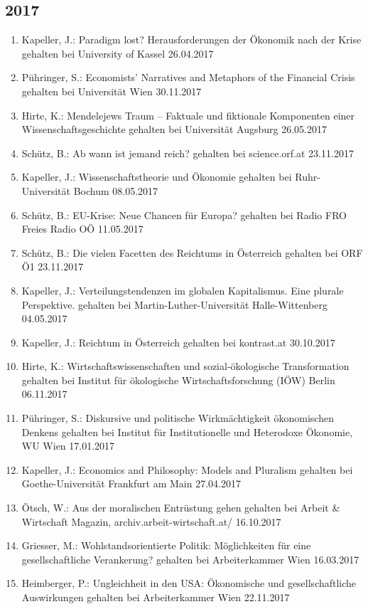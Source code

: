\subsection*{2017}
\begin{enumerate}
	\item Kapeller, J.: Paradigm lost? Herausforderungen der Ökonomik nach der Krise gehalten bei University of Kassel 26.04.2017
	\item Pühringer, S.: Economists' Narratives and Metaphors of the Financial Crisis gehalten bei Universität Wien 30.11.2017
	\item Hirte, K.: Mendelejews Traum – Faktuale und fiktionale Komponenten einer Wissenschaftsgeschichte gehalten bei Universität Augsburg 26.05.2017
	\item Schütz, B.: Ab wann ist jemand reich? gehalten bei science.orf.at 23.11.2017
	\item Kapeller, J.: Wissenschaftstheorie und Ökonomie gehalten bei Ruhr-Universität Bochum 08.05.2017
	\item Schütz, B.: EU-Krise: Neue Chancen für Europa? gehalten bei Radio FRO Freies Radio OÖ 11.05.2017
	\item Schütz, B.: Die vielen Facetten des Reichtums in Österreich gehalten bei ORF Ö1 23.11.2017
	\item Kapeller, J.: Verteilungstendenzen im globalen Kapitalismus. Eine plurale Perspektive. gehalten bei Martin-Luther-Universität Halle-Wittenberg 04.05.2017
	\item Kapeller, J.: Reichtum in Österreich gehalten bei kontrast.at 30.10.2017
	\item Hirte, K.: Wirtschaftswissenschaften und sozial-ökologische Transformation gehalten bei Institut für ökologische Wirtschaftsforschung (IÖW) Berlin 06.11.2017
	\item Pühringer, S.: Diskursive und politische Wirkmächtigkeit ökonomischen Denkens gehalten bei Institut für Institutionelle und Heterodoxe Ökonomie, WU Wien 17.01.2017
	\item Kapeller, J.: Economics and Philosophy: Models and Pluralism gehalten bei Goethe-Universität Frankfurt am Main 27.04.2017
	\item Ötsch, W.: Aus der moralischen Entrüstung gehen gehalten bei Arbeit \& Wirtschaft Magazin, archiv.arbeit-wirtschaft.at/ 16.10.2017
	\item Griesser, M.: Wohlstandsorientierte Politik: Möglichkeiten für eine gesellschaftliche Verankerung? gehalten bei Arbeiterkammer Wien 16.03.2017
	\item Heimberger, P.: Ungleichheit in den USA: Ökonomische und gesellschaftliche Auswirkungen gehalten bei Arbeiterkammer Wien 22.11.2017

\end{enumerate}
